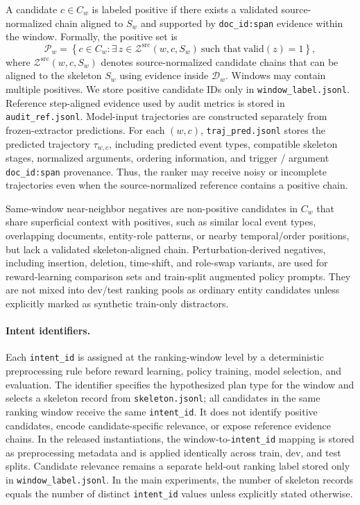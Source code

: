 \documentclass{article}
\begin{document}
A candidate $c\in C_w$ is labeled positive if there exists a validated source-normalized chain aligned to $S_w$ and supported by \texttt{doc\_id:span} evidence within the window.
Formally, the positive set is
\[
\mathcal{P}_w =
\left\{
c\in C_w :
\exists\, z \in \mathcal{Z}^{\mathrm{src}}(w,c,S_w)
\ \text{such that}\ 
\mathrm{valid}(z)=1
\right\},
\]
where $\mathcal{Z}^{\mathrm{src}}(w,c,S_w)$ denotes source-normalized candidate chains that can be aligned to the skeleton $S_w$ using evidence inside $\mathcal{D}_w$.
Windows may contain multiple positives.
We store positive candidate IDs only in \texttt{window\_label.jsonl}.
Reference step-aligned evidence used by audit metrics is stored in \texttt{audit\_ref.jsonl}.
Model-input trajectories are constructed separately from frozen-extractor predictions.
For each $(w,c)$, \texttt{traj\_pred.jsonl} stores the predicted trajectory $\tau_{w,c}$, including predicted event types, compatible skeleton stages, normalized arguments, ordering information, and trigger / argument \texttt{doc\_id:span} provenance.
Thus, the ranker may receive noisy or incomplete trajectories even when the source-normalized reference contains a positive chain.

Same-window near-neighbor negatives are non-positive candidates in $C_w$ that share superficial context with positives, such as similar local event types, overlapping documents, entity-role patterns, or nearby temporal/order positions, but lack a validated skeleton-aligned chain.
Perturbation-derived negatives, including insertion, deletion, time-shift, and role-swap variants, are used for reward-learning comparison sets and train-split augmented policy prompts.
They are not mixed into dev/test ranking pools as ordinary entity candidates unless explicitly marked as synthetic train-only distractors.

\paragraph{Intent identifiers.}
Each \texttt{intent\_id} is assigned at the ranking-window level by a deterministic preprocessing rule before reward learning, policy training, model selection, and evaluation.
The identifier specifies the hypothesized plan type for the window and selects a skeleton record from \texttt{skeleton.jsonl}; all candidates in the same ranking window receive the same \texttt{intent\_id}.
It does not identify positive candidates, encode candidate-specific relevance, or expose reference evidence chains.
In the released instantiations, the window-to-\texttt{intent\_id} mapping is stored as preprocessing metadata and is applied identically across train, dev, and test splits.
Candidate relevance remains a separate held-out ranking label stored only in \texttt{window\_label.jsonl}.
In the main experiments, the number of skeleton records equals the number of distinct \texttt{intent\_id} values unless explicitly stated otherwise.
\end{document}
